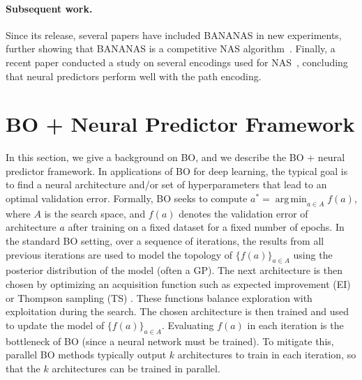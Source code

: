\documentclass[11pt]{article}
\DeclareMathOperator*{\argmin}{arg\,min}
\numberwithin{equation}{section}
\numberwithin{figure}{section}
\theoremstyle{plain}
\theoremstyle{definition}
\newcounter{Frame}
\let\citep\cite
\begin{document}
\paragraph{Subsequent work.}
Since its release, several papers have included BANANAS in new experiments,
further showing that BANANAS is a competitive NAS 
algorithm~\citep{remaade, nasbench301,nguyen2020optimal, nasbowl, npenas}.
Finally, a recent paper conducted a study on several encodings used for 
NAS~\cite{white2020study}, concluding that neural predictors perform well
with the path encoding.

\begin{comment}
state of the art~\citep{remaade, nasbench301},
or second only to follow-up work~\citep{nguyen2020optimal, nasbowl, npenas}.
Notably, one paper~\citep{remaade} showed that BANANAS is state-of-the-art on NASBench-101
when given a budget of 3200 evaluations, and another paper~\citep{nasbench301} showed that
BANANAS is state-of-the-art on a new surrogate benchmark on the DARTS
search space.
Finally, 
a recent paper conducted a study on several encodings used for 
NAS~\cite{white2020study}, concluding that the path encoding,
even when truncated, is particularly well-suited for neural predictors.

\end{comment}

 
\section{BO + Neural Predictor Framework}
\label{sec:preliminaries}
In this section, we give a background on BO, and we describe the
BO + neural predictor framework.
In applications of BO for deep learning, the typical goal is to find a
neural architecture and/or set of hyperparameters that lead to
an optimal validation error. Formally, BO
seeks to compute $a^* = \argmin_{a\in A} f(a)$, where $A$ is
the search space, and $f(a)$
denotes the validation error of architecture $a$ after training
on a fixed dataset for a fixed number of epochs. In the standard 
BO setting,
over a sequence of iterations, the results from all previous iterations 
are used to model the topology of $\{f(a)\}_{a\in A}$ using
the posterior distribution of the model (often a GP).
The next architecture is then chosen by optimizing an acquisition
function such as expected improvement (EI) \cite{movckus1975bayesian}
or Thompson sampling (TS) \cite{thompson1933likelihood}.
These functions balance exploration with exploitation during the search.
The chosen architecture is then trained and used to update the model of $\{f(a)\}_{a\in A}$.
Evaluating $f(a)$ in each iteration is the bottleneck of BO 
(since a neural network must be trained). To mitigate this,
parallel BO methods typically output $k$ architectures to
train in each iteration, so that the $k$
architectures can be trained in parallel.
\end{document}
